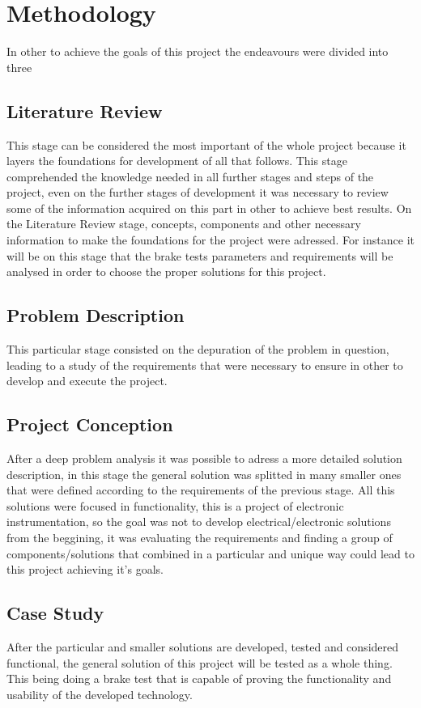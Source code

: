 \chapter{Methodology}\label{ch:methodology}

	In other to achieve the goals of this project the endeavours were divided into three 

	\section{Literature Review}\label{sec:literature-review}
		This stage can be considered the most important of the whole project because it layers the foundations for development of all that follows. This stage comprehended the knowledge needed in all further stages and steps of the project, even on the further stages of development it was necessary to review some of the information acquired on this part in other to achieve best results. On the Literature Review stage, concepts, components and other necessary information to make the foundations for the project were adressed. For instance it will be on this stage that the brake tests parameters and requirements will be analysed in order to choose the proper solutions for this project.

	\section{Problem Description}\label{sec:problem-description}
		This particular stage consisted on the depuration of the problem in question, leading to a study of the requirements that were necessary to ensure in other to develop and execute the project. 

	\section{Project Conception}\label{sec:project-conception}
		After a deep problem analysis it was possible to adress a more detailed solution description, in this stage the general solution was splitted in many smaller ones that were defined according to the requirements of the previous stage. All this solutions were focused in functionality, this is a project of electronic instrumentation, so the goal was not to develop electrical/electronic solutions from the beggining, it was evaluating the requirements and finding a group of components/solutions that combined in a particular and unique way could lead to this project achieving it's goals.
		
	\section{Case Study}\label{sec:case-study}
		After the particular and smaller solutions are developed, tested and considered functional, the general solution of this project will be tested as a whole thing. This being doing a brake test that is capable of proving the functionality and usability of the developed technology.
